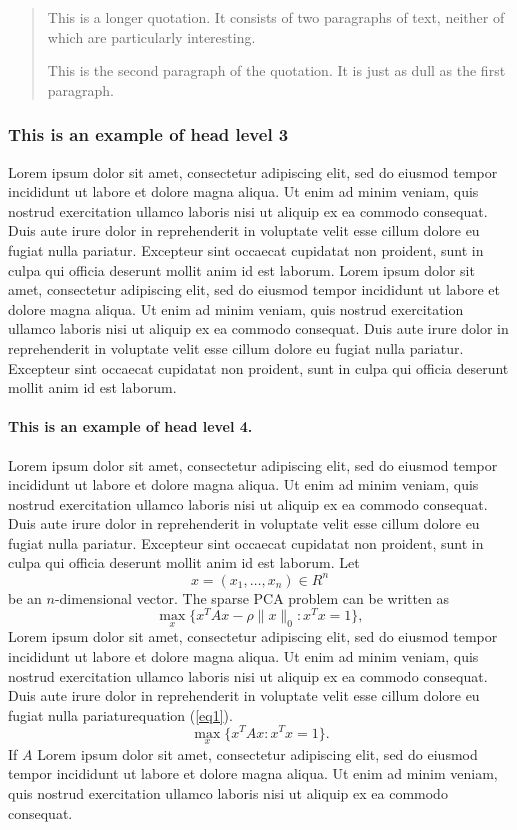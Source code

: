 \documentclass{sbc2025}%
\begin{document}
\begin{quotation}
This is a longer quotation. It consists of two paragraphs of text, neither of which are particularly interesting.

This is the second paragraph of the quotation. It is just as dull as the first paragraph.
\end{quotation} 

\subsubsection{This is an example of head level 3}
Lorem ipsum dolor sit amet, consectetur adipiscing elit, sed do eiusmod tempor incididunt ut labore et dolore magna aliqua. Ut enim ad minim veniam, quis nostrud exercitation ullamco laboris nisi ut aliquip ex ea commodo consequat. Duis aute irure dolor in reprehenderit in voluptate velit esse cillum dolore eu fugiat nulla pariatur. Excepteur sint occaecat cupidatat non proident, sunt in culpa qui officia deserunt mollit anim id est laborum. Lorem ipsum dolor sit amet, consectetur adipiscing elit, sed do eiusmod tempor incididunt ut labore et dolore magna aliqua. Ut enim ad minim veniam, quis nostrud exercitation ullamco laboris nisi ut aliquip ex ea commodo consequat. Duis aute irure dolor in reprehenderit in voluptate velit esse cillum dolore eu fugiat nulla pariatur. Excepteur sint occaecat cupidatat non proident, sunt in culpa qui officia deserunt mollit anim id est laborum.

\paragraph{This is an example of head level 4.}
Lorem ipsum dolor sit amet, consectetur adipiscing elit, sed do eiusmod tempor incididunt ut labore et dolore magna aliqua. Ut enim ad minim veniam, quis nostrud exercitation ullamco laboris nisi ut aliquip ex ea commodo consequat. Duis aute irure dolor in reprehenderit in voluptate velit esse cillum dolore eu fugiat nulla pariatur. Excepteur sint occaecat cupidatat non proident, sunt in culpa qui officia deserunt mollit anim id est laborum. 
Let
\[
x=(x_1,\dots,x_n)\in R^n
\]be an \(n\)-dimensional vector. The sparse PCA problem can be written as
\begin{equation}\label{eq1}
\max\limits_{x}\{x^TAx-\rho\|x\|_0:x^Tx=1\},
\end{equation}
Lorem ipsum dolor sit amet, consectetur adipiscing elit, sed do eiusmod tempor incididunt ut labore et dolore magna aliqua. Ut enim ad minim veniam, quis nostrud exercitation ullamco laboris nisi ut aliquip ex ea commodo consequat. Duis aute irure dolor in reprehenderit in voluptate velit esse cillum dolore eu fugiat nulla pariatur\break equation (\ref{eq1}). 
\[\max\limits_{x}\{x^TAx :x^Tx=1\}.\]
If $A$ Lorem ipsum dolor sit amet, consectetur adipiscing elit, sed do eiusmod tempor incididunt ut labore et dolore magna aliqua. Ut enim ad minim veniam, quis nostrud exercitation ullamco laboris nisi ut aliquip ex ea commodo consequat. 
\end{document}
